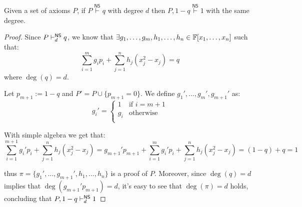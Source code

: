 \begin{proposition}
    \label{neg_refutation}
    Given a set of axioms $P$, if $P \stackrel{\mathsf{NS}}{\vdash} q$ with degree $d$ then $P, 1-q \stackrel{\mathsf{NS}}{\vdash} 1$ with the same degree. 
\end{proposition}

\begin{proof}
    
    Since $P \vdash^{\mathsf{NS}}_d q$, we know that $\exists g_1, \ldots, g_m, h_1, \ldots, h_n \in \mathbb{F}[x_1, \ldots, x_n]$ such that:
    \[\sum_{i = 1}^m g_i p_i + \sum_{j = 1}^n h_j (x_j^2-x_j) = q\]
    where $\deg(q) = d$.

    Let $p_{m+1} := 1-q$ and $P' = P \cup \{p_{m+1} = 0\}$. We define $g_1', \ldots, g_m', g_{m+1}'$ as:
    \[g_i' = \left \{ \begin{array}{ll}
        1 & \text{if } i = m+1 \\
        g_i & \text{otherwise}  \\
    \end{array}\right .\]
    
    With simple algebra we get that:
    \[\sum_{i = 1}^{m+1} g_i' p_i + \sum_{j = 1}^n h_j (x_j^2-x_j) = g_{m+1}'p_{m+1} + \sum_{i = 1}^{m} g_i' p_i + \sum_{j = 1}^n h_j (x_j^2-x_j) = (1-q) + q = 1\]
    
    thus $\pi = \{g_1', \ldots, g_{m+1}', h_1, \ldots, h_n\}$ is a proof of $P$. Moreover, since $\deg(q) = d$ implies that $\deg(g_{m+1}'p_{m+1}) = d$, it's easy to see that $\deg(\pi) = d$ holds, concluding that $P, 1-q \vdash_d^{\mathsf{NS}} 1$

\end{proof}

\cleardoublepage